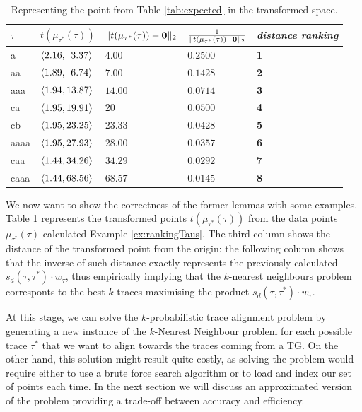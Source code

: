\begin{table}[!t]
\centering
\caption{Representing the point from Table \ref{tab:expected} in the transformed space.}\label{tab:transf}
\begin{tabular}{ll|lll}
	\toprule
	
	$\tau$ & $t(\mu_{\tau^*}(\tau))$ & $\norm{t(\mu_{\tau^*}(\tau))-\vec{0}}{2}$ & $\frac{1}{\norm{t(\mu_{\tau^*}(\tau))-\vec{0}}{2}}$ & \textit{distance ranking}\\
	
	\midrule	
	a   & $\braket{2.16, \;\,3.37}$ & $4.00$ & $0.2500$ & \textbf{1}\\
	{aa}  & $\braket{1.89, \;\,6.74}$ & $7.00$ & $0.1428$ & \textbf{2}\\
	aaa   & $\braket{1.94, 13.87}$ & $14.00$ & $0.0714$ & \textbf{3}\\
	ca   & $\braket{1.95, 19.91}$ & $20$ & $0.0500$ & \textbf{4}\\
	{cb}  & $\braket{1.95, 23.25}$ & $23.33$ & $0.0428$ & \textbf{5}\\
aaaa   & $\braket{1.95, 27.93}$ & $28.00$ & $0.0357$ & \textbf{6}\\
caa   & $\braket{1.44, 34.26}$ & $34.29$ & $0.0292$ & \textbf{7}\\
caaa   & $\braket{1.44, 68.56}$ & $68.57$ & $0.0145$ & \textbf{8}\\
	\bottomrule
\end{tabular}
\end{table}
\begin{example}
We now want to show the correctness of the former lemmas with some examples. 
Table \ref{tab:transf} represents the transformed points $t(\mu_{\tau^*}(\tau))$ from the data points $\mu_{\tau^*}(\tau)$  calculated  Example \ref{ex:rankingTaus}. The third column shows the distance of the transformed point from the origin: the following column shows that the inverse of such distance exactly represents the previously calculated $s_d(\tau,\tau^*)\cdot w_\tau$, thus empirically implying that the $k$-nearest neighbours problem corresponts to the best $k$ traces maximising the product $s_d(\tau,\tau^*)\cdot w_\tau$.
\end{example}





At this stage, we can solve the $k$-probabilistic trace alignment problem by generating a new instance of the $k$-Nearest Neighbour problem for each possible trace $\tau^*$ that we want to align towards the traces coming from a TG. On the other hand, this solution might result quite costly, as solving the problem would require either to use a brute force search algorithm or to load and index our set of points each time. In the next section we will discuss an approximated version of the problem providing a trade-off between accuracy and efficiency.



